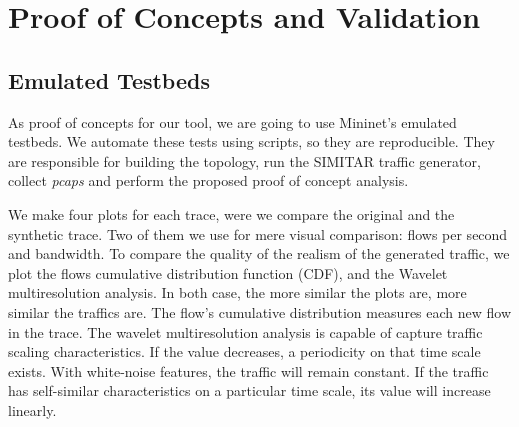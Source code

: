 \chapter{Proof of Concepts and Validation}\label{ch:validation}

\section{Emulated Testbeds}



As proof of concepts for our tool, we are going to use Mininet's emulated testbeds. We automate these tests using scripts, so they are reproducible.  They are responsible for building the topology, run the SIMITAR traffic generator, collect \textit{pcaps} and perform the proposed proof of concept analysis.  

We make four plots for each trace, were we compare the original and the synthetic trace. Two of them we use for mere visual comparison:  flows per second and bandwidth. To compare the quality of the realism of the generated traffic, we plot the flows cumulative distribution function (CDF)\cite{harpoon-paper}, and the Wavelet multiresolution analysis.  In both case, the more similar the plots are, more similar the traffics are. The flow's cumulative distribution measures each new flow in the trace. The wavelet multiresolution analysis is capable of capture traffic scaling characteristics. If the value decreases, a periodicity on that time scale exists. With white-noise features, the traffic will remain constant. If the traffic has self-similar characteristics on a particular time scale, its value will increase linearly.

